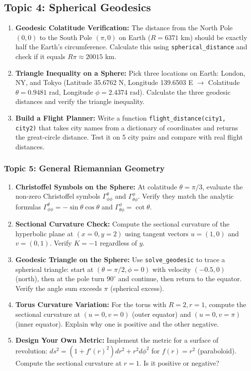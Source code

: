 \documentclass[11pt]{article}
\begin{document}
\subsection{Topic 4: Spherical Geodesics}
\begin{enumerate}
    \item \textbf{Geodesic Colatitude Verification:} The distance from the North Pole $(0, 0)$ to the South Pole $(\pi, 0)$ on Earth ($R=6371$ km) should be exactly half the Earth's circumference. Calculate this using \texttt{spherical\_distance} and check if it equals $R \pi \approx 20015$ km.
    \item \textbf{Triangle Inequality on a Sphere:} Pick three locations on Earth: London, NY, and Tokyo (Latitude 35.6762 N, Longitude 139.6503 E $\to$ Colatitude $\theta = 0.9481$ rad, Longitude $\phi = 2.4374$ rad). Calculate the three geodesic distances and verify the triangle inequality.
    \item \textbf{Build a Flight Planner:} Write a function \texttt{flight\_distance(city1, city2)} that takes city names from a dictionary of coordinates and returns the great-circle distance. Test it on 5 city pairs and compare with real flight distances.
\end{enumerate}

\subsubsection{Topic 5: General Riemannian Geometry}
\begin{enumerate}
    \item \textbf{Christoffel Symbols on the Sphere:} At colatitude $\theta = \pi/3$, evaluate the non-zero Christoffel symbols $\Gamma^\theta_{\phi\phi}$ and $\Gamma^\phi_{\theta\phi}$. Verify they match the analytic formulas $\Gamma^\theta_{\phi\phi} = -\sin\theta\cos\theta$ and $\Gamma^\phi_{\theta\phi} = \cot\theta$.
    \item \textbf{Sectional Curvature Check:} Compute the sectional curvature of the hyperbolic plane at $(x=0, y=2)$ using tangent vectors $u=(1,0)$ and $v=(0,1)$. Verify $K = -1$ regardless of $y$.
    \item \textbf{Geodesic Triangle on the Sphere:} Use \texttt{solve\_geodesic} to trace a spherical triangle: start at $(\theta=\pi/2, \phi=0)$ with velocity $(-0.5, 0)$ (north), then at the pole turn $90^\circ$ and continue, then return to the equator. Verify the angle sum exceeds $\pi$ (spherical excess).
    \item \textbf{Torus Curvature Variation:} For the torus with $R=2, r=1$, compute the sectional curvature at $(u=0, v=0)$ (outer equator) and $(u=0, v=\pi)$ (inner equator). Explain why one is positive and the other negative.
    \item \textbf{Design Your Own Metric:} Implement the metric for a surface of revolution: $ds^2 = (1+f'(r)^2) dr^2 + r^2 d\phi^2$ for $f(r) = r^2$ (paraboloid). Compute the sectional curvature at $r=1$. Is it positive or negative?
\end{enumerate}
\end{document}
